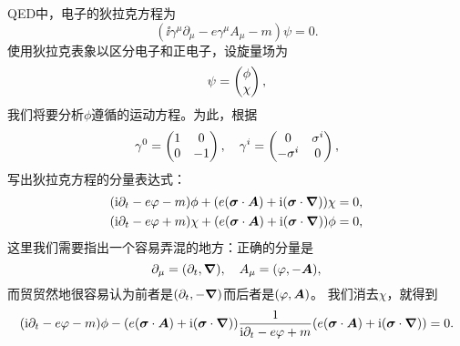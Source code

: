 QED中，电子的狄拉克方程为
\[
    (\ii \gamma^\mu \partial_\mu - e \gamma^\mu A_\mu - m) \psi = 0.
\]
使用狄拉克表象以区分电子和正电子，设旋量场为
\[
    \psi = \pmqty{\phi \\ \chi},
\]
我们将要分析$\phi$遵循的运动方程。为此，根据
\[
    \gamma^0 = \pmqty{1 & 0 \\ 0 & -1}, \quad \gamma^i = \pmqty{0 & \sigma^i \\ - \sigma^i & 0},
\]
写出狄拉克方程的分量表达式：
\[
    \begin{aligned}
        (\mathrm{i} \partial_t - e \varphi - m) \phi + (e (\vb*{\sigma} \cdot \vb*{A}) + \mathrm{i} (\vb*{\sigma} \cdot \grad)) \chi &= 0, \\
        (\mathrm{i} \partial_t - e \varphi + m) \chi + (e (\vb*{\sigma} \cdot \vb*{A}) + \mathrm{i} (\vb*{\sigma} \cdot \grad)) \phi &= 0,
    \end{aligned}
\]
这里我们需要指出一个容易弄混的地方：正确的分量是
\[
    \partial_\mu = (\partial_t, \grad), \quad A_\mu = (\varphi, - \vb*{A}),
\]
而贸贸然地很容易认为前者是$(\partial_t, -\grad)$而后者是$(\varphi, \vb*{A})$。
我们消去$\chi$，就得到
\begin{equation}
    (\mathrm{i} \partial_t - e \varphi - m) \phi - (e (\vb*{\sigma} \cdot \vb*{A}) + \mathrm{i} (\vb*{\sigma} \cdot \grad)) \frac{1}{\mathrm{i} \partial_t - e \varphi + m} (e (\vb*{\sigma} \cdot \vb*{A}) + \mathrm{i} (\vb*{\sigma} \cdot \grad)) = 0.
    \label{eq:electron-only}
\end{equation}

